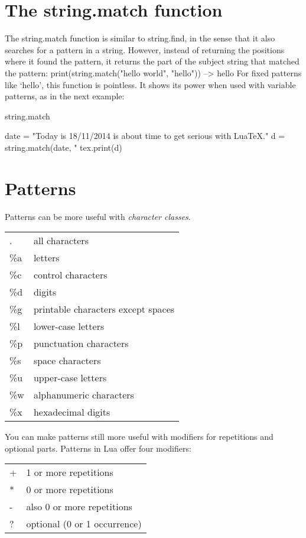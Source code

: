 \section{The string.match function}


The string.match function is similar to string.find, in the sense that it also
searches for a pattern in a string. However, instead of returning the positions
where it found the pattern, it returns the part of the subject string that matched
the pattern:
print(string.match("hello world", "hello")) --> hello
For fixed patterns like ‘hello’, this function is pointless. It shows its power when
used with variable patterns, as in the next example:

\begin{texexample}{string.match}{}
\begin{luacode}
date = "Today is 18/11/2014 is about time to get serious with LuaTeX."
d = string.match(date, "%
tex.print(d) 
\end{luacode}
\end{texexample}

\section{Patterns}

Patterns can be more useful with \textit{character classes}. 

\begin{longtable}{>{\color{blue}}ll}
. & all characters\\
\%a & letters\\
\%c &control characters\\
\%d &digits\\ 
\%g &printable characters except spaces\\
\%l &lower-case letters\\
\%p &punctuation characters\\
\%s &space characters\\
\%u  &upper-case letters\\
\%w  &alphanumeric characters\\
\%x  &hexadecimal digits\\
\end{longtable}

You can make patterns still more useful with modifiers for repetitions and optional parts. Patterns in Lua offer four modifiers:

\begin{center}
\begin{tabular}{ll}
+	&1 or more repetitions\\
*	&0 or more repetitions\\
-	&also 0 or more repetitions\\
?	&optional (0 or 1 occurrence)\\
\end{tabular}
\end{center}







